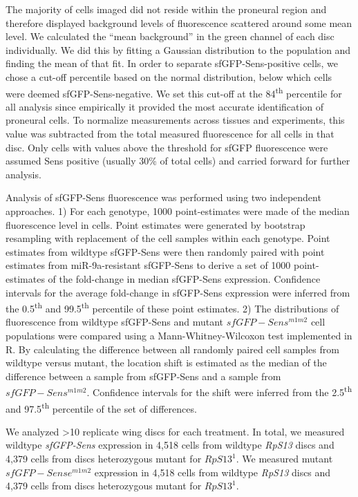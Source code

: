 The majority of cells imaged did not reside within the proneural region and therefore displayed background levels of fluorescence scattered around some mean level. We calculated the ``mean background'' in the green channel of each disc individually. We did this by fitting a Gaussian distribution to the population and finding the mean of that fit. In order to separate sfGFP-Sens-positive cells, we chose a cut-off percentile based on the normal distribution, below which cells were deemed sfGFP-Sens-negative. We set this cut-off at the 84\textsuperscript{th} percentile for all analysis since empirically it provided the most accurate identification of proneural cells. To normalize measurements across tissues and experiments, this value was subtracted from the total measured fluorescence for all cells in that disc. Only cells with values above the threshold for sfGFP fluorescence were assumed Sens positive (usually 30\% of total cells) and carried forward for further analysis.

Analysis of sfGFP-Sens fluorescence was performed using two independent approaches. 1) For each genotype, 1000 point-estimates were made of the median fluorescence level in cells. Point estimates were generated by bootstrap resampling with replacement of the cell samples within each genotype. Point estimates from wildtype sfGFP-Sens were then randomly paired with point estimates from miR-9a-resistant sfGFP-Sens to derive a set of 1000 point-estimates of the fold-change in median sfGFP-Sens expression. Confidence intervals for the average fold-change in sfGFP-Sens expression were inferred from the 0.5\textsuperscript{th} and 99.5\textsuperscript{th} percentile of these point estimates. 2) The distributions of fluorescence from wildtype sfGFP-Sens and mutant $sfGFP-Sens^{m1m2}$ cell populations were compared using a Mann-Whitney-Wilcoxon test implemented in R. By calculating the difference between all randomly paired cell samples from wildtype versus mutant, the location shift is estimated as the median of the difference between a sample from sfGFP-Sens and a sample from $sfGFP-Sens^{m1m2}$. Confidence intervals for the shift were inferred from the 2.5\textsuperscript{th} and 97.5\textsuperscript{th} percentile of the set of differences.

We analyzed \textgreater{}10 replicate wing discs for each treatment. In total, we measured wildtype \textit{sfGFP-Sens} expression in 4,518 cells from wildtype \textit{RpS13} discs and 4,379 cells from discs heterozygous mutant for $RpS13^1$. We measured mutant $sfGFP-Sense^{m1m2}$ expression in 4,518 cells from wildtype \textit{RpS13} discs and 4,379 cells from discs heterozygous mutant for $RpS13^1$.


